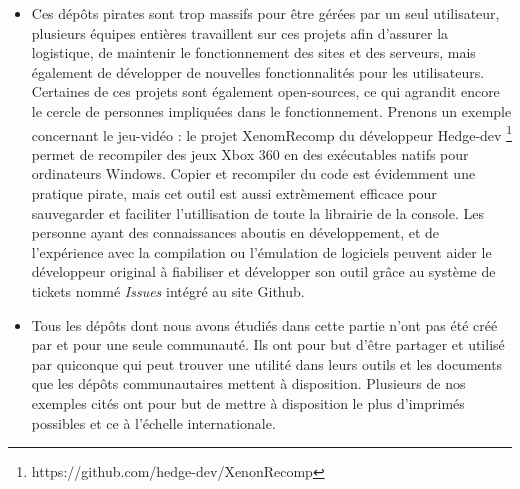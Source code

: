 \begin{itemize}
    \item Ces dépôts pirates sont trop massifs pour être gérées par un seul utilisateur, plusieurs équipes entières travaillent sur ces projets afin d'assurer la logistique, de maintenir le fonctionnement des sites et des serveurs, mais également de développer de nouvelles fonctionnalités pour les utilisateurs. Certaines de ces projets sont également open-sources, ce qui agrandit encore le cercle de personnes impliquées dans le fonctionnement. Prenons un exemple concernant le jeu-vidéo : le projet XenomRecomp du développeur Hedge-dev \footnote{https://github.com/hedge-dev/XenonRecomp} permet de recompiler des jeux Xbox 360 en des exécutables natifs pour ordinateurs Windows. Copier et recompiler du code est évidemment une pratique pirate, mais cet outil est aussi extrèmement efficace pour sauvegarder et faciliter l'utillisation de toute la librairie de la console. Les personne ayant des connaissances aboutis en développement, et de l'expérience avec la compilation ou l'émulation de logiciels peuvent aider le développeur original à fiabiliser et développer son outil grâce au système de tickets nommé \textit{Issues} intégré au site Github.

    \item Tous les dépôts dont nous avons étudiés dans cette partie n'ont pas été créé par et pour une seule communauté. Ils ont pour but d'être partager et utilisé par quiconque qui peut trouver une utilité dans leurs outils et les documents que les dépôts communautaires mettent à disposition. Plusieurs de nos exemples cités ont pour but de mettre à disposition le plus d'imprimés possibles et ce à l'échelle internationale. 
\end{itemize}

